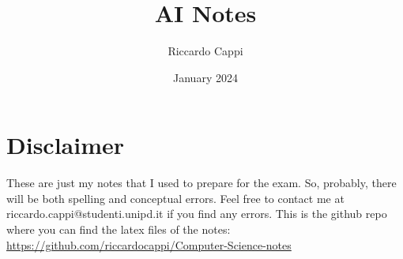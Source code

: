 \documentclass{book}
\title{AI Notes}
\author{Riccardo Cappi}
\date{January 2024}
\begin{document}
\maketitle

\section{Disclaimer}
These are just my notes that I used to prepare for the exam. So, probably, there will be both spelling and conceptual errors. Feel free to contact me at riccardo.cappi@studenti.unipd.it if you find any errors. This is the github repo where you can find the latex files of the notes: \url{https://github.com/riccardocappi/Computer-Science-notes}

\tableofcontents

























\end{document}
